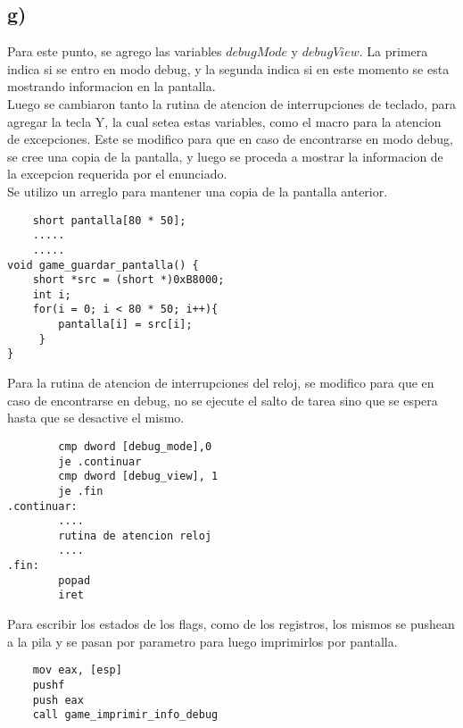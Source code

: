 \subsection*{g)}

\noindent Para este punto, se agrego las variables $debugMode$ y $debugView$. La primera indica si se entro en modo debug, y la segunda indica si en este momento se esta mostrando informacion en la pantalla. \\

\noindent Luego se cambiaron tanto la rutina de atencion de interrupciones de teclado, para agregar la tecla Y, la cual setea estas variables, como el macro para la atencion de excepciones. Este se modifico para que en caso de encontrarse en modo debug, se cree una copia de la pantalla, y luego se proceda a mostrar la informacion de la excepcion requerida por el enunciado. \\

\noindent Se utilizo un arreglo para mantener una copia de la pantalla anterior.

\begin{codesnippet}
\begin{verbatim}
    short pantalla[80 * 50];
    .....
    .....
void game_guardar_pantalla() {
    short *src = (short *)0xB8000;
    int i;
    for(i = 0; i < 80 * 50; i++){
        pantalla[i] = src[i];
     }
}
\end{verbatim}
\end{codesnippet}

\noindent Para la rutina de atencion de interrupciones del reloj, se modifico para que en caso de encontrarse en debug, no se ejecute el salto de tarea sino que se espera hasta que se desactive el mismo.
\begin{codesnippet}
\begin{verbatim}
        cmp dword [debug_mode],0
        je .continuar
        cmp dword [debug_view], 1
		je .fin
.continuar:
        ....
        rutina de atencion reloj
        ....
.fin:
        popad  
        iret
\end{verbatim}
\end{codesnippet}

\noindent Para escribir los estados de los flags, como de los registros, los mismos se pushean a la pila y se pasan por parametro para luego imprimirlos por pantalla.

\begin{codesnippet}
\begin{verbatim}
    mov eax, [esp]
    pushf 									
    push eax
    call game_imprimir_info_debug
\end{verbatim}
\end{codesnippet}
